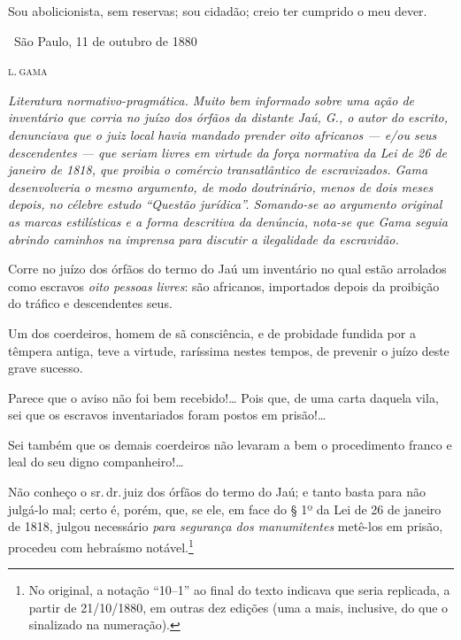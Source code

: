Sou abolicionista, sem reservas; sou cidadão; creio ter cumprido o meu
dever.

\medskip

\hfill\ São Paulo, 11 de outubro de 1880

\hfill\textsc{l.\,gama}


\begin{resumo}
\emph{Literatura normativo-pragmática. Muito bem informado sobre uma
ação de inventário que corria no juízo dos órfãos da distante Jaú, G., o
autor do escrito, denunciava que o juiz local havia mandado prender oito
africanos --- e/ou seus descendentes --- que seriam livres em virtude da
força normativa da Lei de 26 de janeiro de 1818, que proibia o comércio
transatlântico de escravizados. Gama desenvolveria o mesmo argumento, de
modo doutrinário, menos de dois meses depois, no célebre estudo ``Questão
jurídica''. Somando-se ao argumento original as marcas estilísticas e a
forma descritiva da denúncia, nota-se que Gama seguia abrindo caminhos
na imprensa para discutir a ilegalidade da escravidão. }
\end{resumo}

Corre no juízo dos órfãos do termo do Jaú um inventário no qual estão
arrolados como escravos \emph{oito pessoas livres}: são africanos,
importados depois da proibição do tráfico e descendentes seus.

Um dos coerdeiros, homem de sã consciência, e de probidade fundida por a
têmpera antiga, teve a virtude, raríssima nestes tempos, de prevenir o
juízo deste grave sucesso.

Parece que o aviso não foi bem recebido!\ldots{} Pois que, de uma carta
daquela vila, sei que os escravos inventariados foram postos em
prisão!\ldots{}

Sei também que os demais coerdeiros não levaram a bem o procedimento
franco e leal do seu digno companheiro!\ldots{}

Não conheço o sr.\,dr.\,juiz dos órfãos do termo do Jaú; e tanto basta
para não julgá-lo mal; certo é, porém, que, se ele, em face do § 1º da
Lei de 26 de janeiro de 1818, julgou necessário \emph{para segurança dos
manumitentes} metê-los em prisão, procedeu com hebraísmo notável.\footnote{No original, a notação ``10--1'' ao final do texto indicava que seria replicada, a partir de
  21/10/1880, em outras dez edições (uma a mais, inclusive, do que o
  sinalizado na numeração).}

